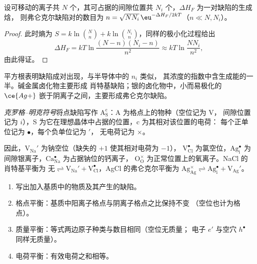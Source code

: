 \begin{proposition}[弗仑克尔缺陷]\label{prop:b3:solid-state:frenkel}
设可移动的离子共 $N$ 个，其可占据的间隙位置共 $N_i$ 个，$\Delta H_F$ 为一对缺陷的生成焓，
则弗仑克尔缺陷对的数目为 $n =
\sqrt{NN_i}\,\eu^{-\Delta H_F/2kT}$（$n \ll N, N_i$）。
\end{proposition}

\begin{proof}
此时熵为 $S = k\ln\binom{N}{n} + k\ln\binom{N_i}{n}$，同样的极小化过程给出
\[
  \Delta H_F = kT\ln\frac{(N - n)(N_i - n)}{n^2} \approx kT\ln\frac{NN_i}{n^2},
\]
由此得证。
\end{proof}

平方根表明缺陷成对出现，与半导体中的 $n_i$ 类似，
其浓度的指数中含生成能的一半。碱金属卤化物主要形成
肖特基缺陷；银的卤化物中，小而易极化的
$\ce{Ag+}$ 嵌于阴离子之间，主要形成弗仑克尔缺陷。

\begin{definition}\label{def:b3:solid-state:kroger-vink}
\emph{克罗格–明克符号}将点缺陷写作
$\mathrm{A_S^c}$：A 为格点上的物种（空位记为 V，
间隙位置记为 $i$），S 为它在理想晶体中占据的位置，c 为其相对该位置的电荷：
每个正单位记为 $\bullet$，每个负单位记为 $'$，
无电荷记为 $\times$。
\end{definition}

因此，$\mathrm{V_{Na}'}$ 为钠空位（缺失的 $+1$ 使其相对电荷为 $-1$），
$\mathrm{V_{Cl}^{\bullet}}$ 为氯空位，$\mathrm{Ag_i^{\bullet}}$ 为间隙银离子，$\mathrm{Ca_{Na}^{\bullet}}$ 为占据钠位的钙离子，
$\mathrm{O_O^{\times}}$ 为正常位置上的氧离子。NaCl 的肖特基平衡为
$\text{无} \rightleftharpoons \mathrm{V_{Na}' + V_{Cl}^{\bullet}}$，AgCl 的弗仑克尔平衡为
$\mathrm{Ag_{Ag}^{\times}} \rightleftharpoons \mathrm{Ag_i^{\bullet} + V_{Ag}'}$。

\begin{method}[书写缺陷方程]\label{met:b3:solid-state:kroger-vink}
\begin{enumerate}
  \item 写出加入基质中的物质及其产生的缺陷。
  \item 格点平衡：基质中阳离子格点与阴离子格点之比保持不变
        （空位也计为格点）。
  \item 质量平衡：等式两边原子种类与数目相同（空位无质量；
        电子 $e'$ 与空穴 $h^\bullet$ 同样无质量）。
  \item 电荷平衡：有效电荷之和相等。
\end{enumerate}
\end{method}

